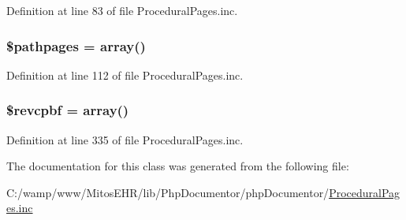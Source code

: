 \-Definition at line 83 of file \-Procedural\-Pages.\-inc.

\hypertarget{class_procedural_pages_ad6e296ccd3b91bbf76e563c74385dd61}{
\subsubsection[{\$pathpages}]{\setlength{\rightskip}{0pt plus 5cm}\$pathpages = array()}}\label{class_procedural_pages_ad6e296ccd3b91bbf76e563c74385dd61}


\-Definition at line 112 of file \-Procedural\-Pages.\-inc.

\hypertarget{class_procedural_pages_a7b960874a2bd62df1a63a44e7d1c9fbc}{
\subsubsection[{\$revcpbf}]{\setlength{\rightskip}{0pt plus 5cm}\$revcpbf = array()}}\label{class_procedural_pages_a7b960874a2bd62df1a63a44e7d1c9fbc}


\-Definition at line 335 of file \-Procedural\-Pages.\-inc.



\-The documentation for this class was generated from the following file\-:\begin{DoxyCompactItemize}
\item 
\-C\-:/wamp/www/\-Mitos\-E\-H\-R/lib/\-Php\-Documentor/php\-Documentor/\hyperlink{_procedural_pages_8inc}{\-Procedural\-Pages.\-inc}\end{DoxyCompactItemize}
